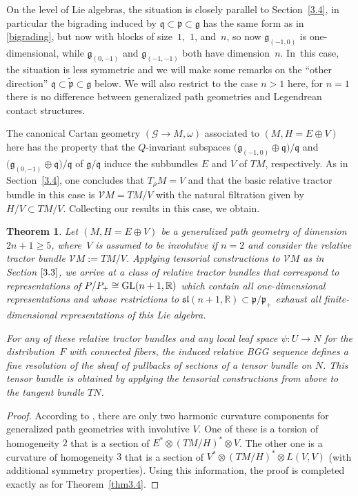 \documentclass[pdftex]{sigma}
\numberwithin{equation}{section}
\newtheorem{Theorem}{Theorem}[section]
\def\frak{\mathfrak}
\def\Bbb{\mathbb}
\def\Cal{\mathcal}
\newcommand{\om}{\omega}
\begin{document}
On the level of Lie algebras, the situation is closely parallel to Section~\ref{3.4}, in
particular the bigrading induced by $\frak q\subset\frak p\subset\frak g$ has the
same form as in \eqref{bigrading}, but now with blocks of size~$1$,~$1$, and~$n$, so
now $\frak g_{(-1,0)}$ is one-dimensional, while $\frak g_{(0,-1)}$ and
$\frak g_{(-1,-1)}$ both have dimension~$n$. In~this case, the situation is less
symmetric and we will make some remarks on the ``other direction'' $\frak
q\subset\tilde{\frak p}\subset\frak g$ below. We will also restrict to the case $n>1$
here, for $n=1$ there is no difference between generalized path geometries and
Legendrean contact structures.

The canonical Cartan geometry $(\Cal G\to M,\om)$ associated to $(M,H=E\oplus V)$
here has the property that the $Q$-invariant subspaces
$\bigl(\frak g_{(-1,0)}\oplus\frak q\bigr)/\frak q$ and
$\bigl(\frak g_{(0,-1)}\oplus\frak q\bigr)/\frak q$ of $\frak g/\frak q$ induce the subbundles
$E$ and $V$ of $TM$, respectively. As in Section~\ref{3.4}, one concludes that $T_\rho M=V$
and that the basic relative tractor bundle in this case is $\Cal VM=TM/V$ with the
natural filtration given by $H/V\subset TM/V$. Collecting our results in this case,
we obtain.

\begin{Theorem}\label{thm3.5}
 Let $(M,H=E\oplus V)$ be a generalized path geometry of dimension $2n+1\geq 5$,
 where~$V$ is assumed to be involutive if $n=2$ and consider the relative tractor
 bundle $\Cal VM:=TM/V$. Applying tensorial constructions to $\Cal VM$ as in Section
 $\ref{3.3}$, we arrive at a class of relative tractor bundles that correspond to
 representations of $P/P_+\cong {\rm GL}(n+1,\Bbb R)$ which contain all one-dimensional
 representations and whose restrictions to
 $\frak{sl}(n+1,\Bbb R)\subset\frak p/\frak p_+$ exhaust all finite-dimensional
 representations of this Lie algebra.

 For any of these relative tractor bundles and any local leaf space $\psi\colon U\to N$ for
 the distribution~$F$ with connected fibers, the induced relative BGG sequence
 defines a fine resolution of the sheaf of pullbacks of sections of a tensor bundle
 on $N$. This tensor bundle is obtained by applying the tensorial constructions from
 above to the tangent bundle $TN$.
\end{Theorem}
\begin{proof}
 According to \cite[Section 4.4.3]{book}, there are only two harmonic curvature
 components for generalized path geometries with involutive $V$. One of these is a
 torsion of homogeneity $2$ that is a section of $E^*\otimes (TM/H)^*\otimes V$. The
 other one is a curvature of homogeneity $3$ that is a section of $V^*\otimes
 (TM/H)^*\otimes L(V,V)$ (with additional symmetry properties). Using this
 information, the proof is completed exactly as for Theorem~\ref{thm3.4}.
\end{proof}
\end{document}
